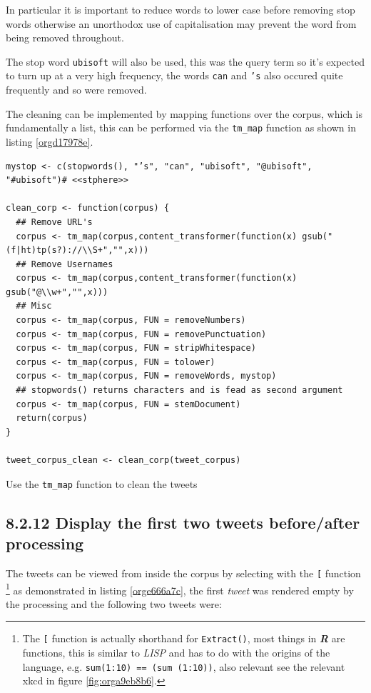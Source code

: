 \documentclass[11pt]{article}
\begin{document}
In particular it is important to reduce words to lower case before removing stop words otherwise an unorthodox use of capitalisation may prevent the word from being removed throughout.

The stop word \texttt{ubisoft} will also be used, this was the query term so it's expected to turn up at a very high frequency, the words \texttt{can} and \texttt{'s} also occured quite frequently and so were removed.

The cleaning can be implemented by mapping functions over the corpus, which is fundamentally a list, this can be performed via the \texttt{tm\_map} function as shown in listing \ref{orgd17978e}.



\begin{listing}[htbp]
\begin{verbatim}
mystop <- c(stopwords(), "’s", "can", "ubisoft", "@ubisoft", "#ubisoft")# <<stphere>>

clean_corp <- function(corpus) {
  ## Remove URL's
  corpus <- tm_map(corpus,content_transformer(function(x) gsub("(f|ht)tp(s?)://\\S+","",x)))
  ## Remove Usernames
  corpus <- tm_map(corpus,content_transformer(function(x) gsub("@\\w+","",x)))
  ## Misc
  corpus <- tm_map(corpus, FUN = removeNumbers)
  corpus <- tm_map(corpus, FUN = removePunctuation)
  corpus <- tm_map(corpus, FUN = stripWhitespace)
  corpus <- tm_map(corpus, FUN = tolower)
  corpus <- tm_map(corpus, FUN = removeWords, mystop)
  ## stopwords() returns characters and is fead as second argument
  corpus <- tm_map(corpus, FUN = stemDocument)
  return(corpus)
}

tweet_corpus_clean <- clean_corp(tweet_corpus)
\end{verbatim}
\caption{\label{orgd17978e}Use the \texttt{tm\_map} function to clean the tweets}
\end{listing}

\subsection{8.2.12 Display the first two tweets before/after processing}
\label{sec:org3a7d5f1}
The tweets can be viewed from inside the corpus by selecting with the \texttt{[} function \footnote{The \texttt{[} function is actually shorthand for \texttt{Extract()}, most things in
\textbf{\emph{R}} are functions, this is similar to \emph{LISP} and has to do with the origins of
the language, e.g. \texttt{sum(1:10) == (sum (1:10))}, also relevant see the relevant
xkcd in figure \ref{fig:orga9eb8b6}.} as demonstrated in listing \ref{orge666a7c}, the first \emph{tweet} was rendered empty by the processing and the following two tweets were:
\end{document}
